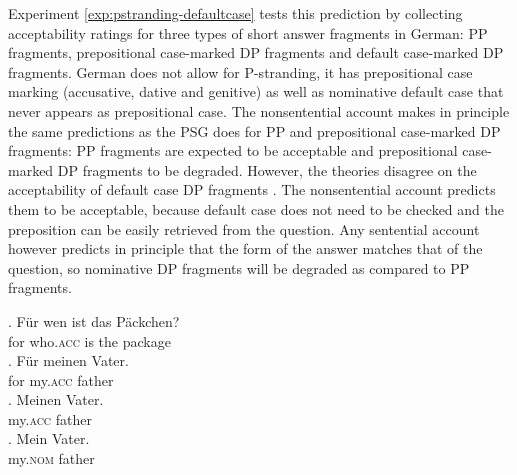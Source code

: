 Experiment \ref{exp:pstranding-defaultcase} tests this prediction by collecting acceptability ratings for three types of short answer fragments in German: PP fragments, prepositional case-marked DP fragments and default case-marked DP fragments. German does not allow for P-stranding, it has prepositional case marking (accusative, dative and genitive) as well as nominative default case that never appears as prepositional case. The nonsentential account makes in principle the same predictions as the PSG does for PP and prepositional case-marked DP fragments: PP fragments \Next[a] are expected to be acceptable and prepositional case-marked DP fragments \Next[b] to be degraded. However, the theories disagree on the acceptability of default case DP fragments \Next[c]. The nonsentential account predicts them to be acceptable, because default case does not need to be checked and the preposition can be easily retrieved from the question. Any sentential account however predicts in principle that the form of the answer matches that of the question, so nominative DP fragments will be degraded as compared to PP fragments. 

\exg.  Für wen ist das Päckchen?\label{ex:pstranding-defaultcase-sample-item}\\
     for who.\textsc{acc} is the package\\
    \ag. Für meinen Vater.\\
     for my.\textsc{acc} father\\
\bg. Meinen Vater. \\
     my.\textsc{acc} father\\
 \cg. Mein Vater. \\
     my.\textsc{nom} father\\

